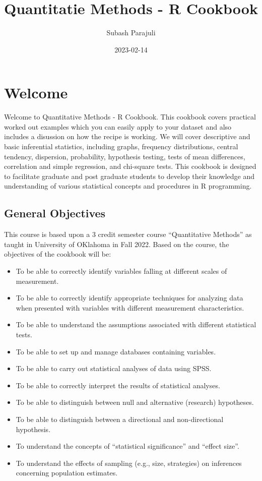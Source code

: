 \documentclass[
]{book}
\title{Quantitatie Methods - R Cookbook}
\author{Subash Parajuli}
\date{2023-02-14}
\begin{document}
\maketitle

{
\setcounter{tocdepth}{1}
\tableofcontents
}
\hypertarget{welcome}{%
\chapter{Welcome}\label{welcome}}

Welcome to Quantitative Methods - R Cookbook. This cookbook covers practical worked out examples which you can easily apply to your dataset and also includes a disussion on how the recipe is working. We will cover descriptive and basic inferential statistics, including graphs, frequency distributions, central tendency, dispersion, probability, hypothesis testing, tests of mean differences, correlation and simple regression, and chi-square tests. This cookbook is designed to facilitate graduate and post graduate students to develop their knowledge and understanding of various statistical concepts and procedures in R programming.

\hypertarget{general-objectives}{%
\section{General Objectives}\label{general-objectives}}

This course is based upon a 3 credit semester course ``Quantitative Methods'' as taught in University of OKlahoma in Fall 2022. Based on the course, the objectives of the cookbook will be:

\begin{itemize}
\item
  To be able to correctly identify variables falling at different scales of measurement.
\item
  To be able to correctly identify appropriate techniques for analyzing data when presented with variables with different measurement characteristics.
\item
  To be able to understand the assumptions associated with different statistical tests.
\item
  To be able to set up and manage databases containing variables.
\item
  To be able to carry out statistical analyses of data using SPSS.
\item
  To be able to correctly interpret the results of statistical analyses.
\item
  To be able to distinguish between null and alternative (research) hypotheses.
\item
  To be able to distinguish between a directional and non-directional hypothesis.
\item
  To understand the concepts of ``statistical significance'' and ``effect size''.
\item
  To understand the effects of sampling (e.g., size, strategies) on inferences concerning population estimates.
\end{itemize}
\end{document}
